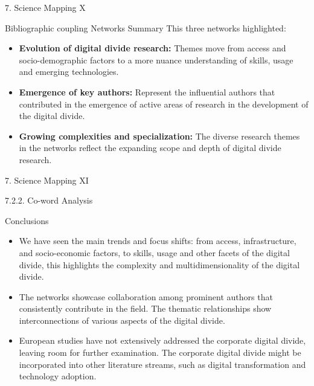 \documentclass[
  ignorenonframetext,
]{beamer}
\begin{document}
\begin{frame}{7. Science Mapping X}
\protect\hypertarget{science-mapping-x}{}
\begin{block}{Bibliographic coupling Networks Summary}
\protect\hypertarget{bibliographic-coupling-networks-summary}{}
This three networks highlighted:

\begin{itemize}
\item
  \textbf{Evolution of digital divide research:} Themes move from access
  and socio-demographic factors to a more nuance understanding of
  skills, usage and emerging technologies.
\item
  \textbf{Emergence of key authors:} Represent the influential authors
  that contributed in the emergence of active areas of research in the
  development of the digital divide.
\item
  \textbf{Growing complexities and specialization:} The diverse research
  themes in the networks reflect the expanding scope and depth of
  digital divide research.
\end{itemize}
\end{block}
\end{frame}

\begin{frame}{7. Science Mapping XI}
\protect\hypertarget{science-mapping-xi}{}
\begin{block}{7.2.2. Co-word Analysis}
\protect\hypertarget{co-word-analysis}{}
\end{block}
\end{frame}

\begin{frame}{Conclusions}
\protect\hypertarget{conclusions}{}
\begin{itemize}
\item
  We have seen the main trends and focus shifts: from access,
  infrastructure, and socio-economic factors, to skills, usage and other
  facets of the digital divide, this highlights the complexity and
  multidimensionality of the digital divide.
\item
  The networks showcase collaboration among prominent authors that
  consistently contribute in the field. The thematic relationships show
  interconnections of various aspects of the digital divide.
\item
  European studies have not extensively addressed the corporate digital
  divide, leaving room for further examination. The corporate digital
  divide might be incorporated into other literature streams, such as
  digital transformation and technology adoption.
\end{itemize}
\end{frame}
\end{document}
